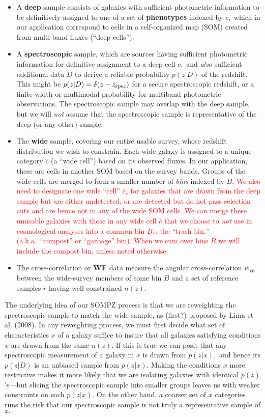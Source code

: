 \documentclass[11pt,preprint,flushrt]{aastex631}
\begin{document}
\begin{itemize}
\item   A \textbf{deep} sample consists of galaxies with sufficient
  photometric information to be definitively assigned to one of a set
  of \textbf{phenotypes} indexed by $c,$ which in our application
  correspond to cells in a self-organized map (SOM) created from
  multi-band fluxes (``deep cells'').
\item A \textbf{spectroscopic} sample, which are sources having
  sufficient photometric information for definitive assignment to a
  deep cell $c,$ and \emph{also} sufficient additional data $D$ to
  derive a reliable probability $p(z | D)$ of the redshift.  This
  might be $p(z|D) = \delta(z-z_{\rm spec})$ for a secure
  spectroscopic redshift, or a finite-width or multimodal probability
  for multiband photometric observations.  The spectroscopic sample
  may overlap with the deep sample, but we will \emph{not} assume that
  the spectroscopic sample is representative of the deep (or any
  other) sample.
\item The \textbf{wide} sample, covering our entire usable survey,
  whose redshift distribution we wish to constrain.  Each wide galaxy
  is assigned to a unique category $\hat c$ (a ``wide cell'') based on
  its observed fluxes.  In our application, these are cells in another
  SOM based on the survey bands.  Groups of the wide cells are merged
  to form a smaller number of \emph{bins} indexed by $B.$
  \textcolor{red}{We also need to designate one wide ``cell'' $\hat
    c_{\bar s}$ for galaxies that are drawn from the deep sample but
    are either undetected, or are detected but do not pass selection
    cuts and are hence not in any of the wide SOM cells.  We can merge
    these unusable galaxies with those in any wide cell $\hat c$ that
    we choose to \emph{not} use in cosmological analyses into a common
    bin $B_T$, the ``trash bin,'' (a.k.a.\ ``compost'' or ``garbage''
    bin).  When we sum over bins $B$ we will include the compost bin,
    unless noted otherwise.}
\item The cross-correlation or \textbf{WF} data measure the angular
  cross-correlation $w_{Br}$ between the wide-survey members of some
  bin $B$ and a set of reference samples $r$ having well-constrained $n(z).$
\end{itemize}

The underlying idea of our SOMPZ process is that we are reweighting
the spectroscopic sample to match the wide sample, as (first?)
proposed by Lima et al. (2008).  In any reweighting process, 
we must first decide what set of
characteristics $x$ of a galaxy suffice to insure that all galaxies
satisfying conditions $x$ are drawn from the same $n(z)$.  If this is true we
can posit that any spectroscopic measurement of a galaxy in $x$ is
drawn from $p(z|x),$ and hence its $p(z|D)$ is an unbiased sample from $p(z|x).$
Making the conditions $x$ more restrictive makes it more likely that
we are isolating galaxies with identical $p(z)$'s---but slicing the
spectroscopic sample into smaller groups leaves us with weaker
constraints on each $p(z|x).$    On the other hand, a coarser set of
$x$ categories runs the risk that our spectroscopic sample is not
truly a representative sample of $x.$
\end{document}
